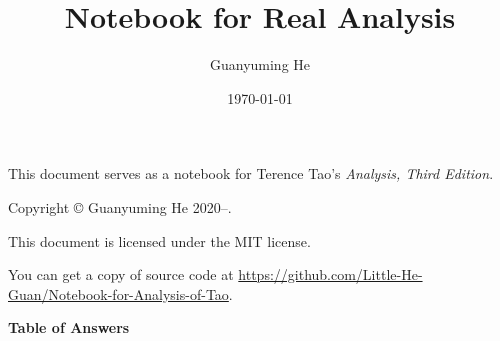 \documentclass[11pt]{article}
\author{Guanyuming He}
\title{Notebook for Real Analysis}
\date{\today}
\begin{document}
\maketitle

\begin{center}
This document serves as a notebook for Terence Tao's \emph{Analysis, Third Edition}.
\end{center}

\vspace{\fill}

\begin{center}
Copyright \copyright{} Guanyuming He 2020--\the\year{}. 

This document is licensed under the MIT license.

You can get a copy of source code at 
\url{https://github.com/Little-He-Guan/Notebook-for-Analysis-of-Tao}.
\end{center}

\newpage
{}
\tableofcontents

\newpage


\newpage
{}
\pagestyle{headings}



\newpage


\newpage


\newpage


\newpage


\newpage


\newpage
\pagestyle{myheadings}

\begin{center}
\begin{Large}
\textbf{Table of Answers}
\end{Large}
\end{center}
\end{document}
